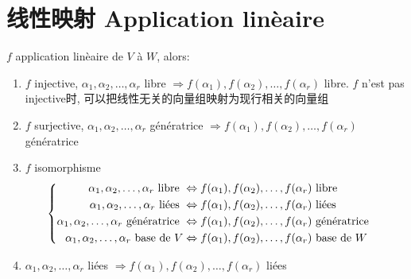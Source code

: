 \documentclass{book}
\begin{document}
\chapter{线性映射 Application lin\`eaire}
$f$ application lin\`eaire de $V$ \`a $W$, alors:
\begin{enumerate}
\item $f$ injective, $\alpha_1, \alpha_2, \ldots, \alpha_r$ libre $\Rightarrow f(\alpha_1), f(\alpha_2), \ldots, f(\alpha_r)$ libre.
	$f$ n'est pas injective时, 可以把线性无关的向量组映射为现行相关的向量组
\item $f$ surjective, $\alpha_1, \alpha_2, \ldots, \alpha_r$ g\'en\'eratrice $\Rightarrow f(\alpha_1), f(\alpha_2), \ldots, f(\alpha_r)$ g\'en\'eratrice 
\item $f$ isomorphisme
	$$
	\begin{cases}
	\begin{aligned}
			\alpha_1, \alpha_2, \ldots, \alpha_r \text{ libre } & \Leftrightarrow f(\alpha_1), f(\alpha_2), \ldots, f(\alpha_r) \text{ libre } \\
	\alpha_1, \alpha_2, \ldots, \alpha_r \text{ li\'ees } & \Leftrightarrow f(\alpha_1), f(\alpha_2), \ldots, f(\alpha_r) \text{ li\'ees } \\
	\alpha_1, \alpha_2, \ldots, \alpha_r \text{ g\'en\'eratrice } & \Leftrightarrow f(\alpha_1), f(\alpha_2), \ldots, f(\alpha_r) \text{ g\'en\'eratrice } \\
	\alpha_1, \alpha_2, \ldots, \alpha_r \text{ base de } V & \Leftrightarrow f(\alpha_1), f(\alpha_2), \ldots, f(\alpha_r) \text{ base de } W
	\end{aligned}
	\end{cases}
	$$
\item $\alpha_1, \alpha_2, \ldots, \alpha_r$ li\'ees $\Rightarrow f(\alpha_1), f(\alpha_2), \ldots, f(\alpha_r)$ li\'ees
\end{enumerate}
\end{document}
